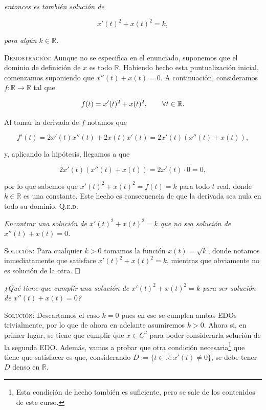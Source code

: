 \documentclass{article}
\begin{document}
\begin{enumerate}
    \textit{entonces es también solución de}

    \[x'(t)^2 + x(t)^2 = k,\]

    \textit{para algún $k \in \mathbb{R}$.}

    \vspace{7px}

    \textsc{Demostración:} Aunque no se especifica en el enunciado, 
    suponemos que el dominio de definición de $x$ es todo $\mathbb{R}$. Habiendo hecho esta puntualización inicial, comenzamos suponiendo que $x''(t) + x(t) = 0$. A continuación, consideramos $f : \mathbb{R} \longrightarrow \mathbb{R}$ tal que 
    
    \[f(t) = x'(t)^2 + x(t)^2, \hspace{20px} \forall t \in \mathbb{R}.\]

    Al tomar la derivada de $f$ notamos que

    \[f'(t) = 2x'(t)x''(t) + 2x(t)x'(t) = 2x'(t)(x''(t) + x(t)),\]

    y, aplicando la hipótesis, llegamos a que

    \[2x'(t)(x''(t) + x(t)) = 2x'(t) \cdot 0 = 0,\]

    por lo que sabemos que $x'(t)^2 + x(t)^2 = f(t) = k$ para todo $t$ real, donde $k \in \mathbb{R}$ es una constante. Este hecho es consecuencia de que la derivada sea nula en todo su dominio. \hfill{\textsc{Q.e.d.}}

    \vspace{7px}

    \textit{Encontrar una solución de $x'(t)^2 + x(t)^2 = k$ que no sea solución de $x''(t) + x(t) = 0$.}

    \vspace{7px}

    \textsc{Solución:} Para cualquier $k > 0$ tomamos la función $x(t) = \sqrt{k}$, donde notamos inmediatamente que satisface $x'(t)^2 + x(t)^2 = k$, mientras que obviamente no es solución de la otra. $\hfill\square$

    \newpage

    \textit{¿Qué tiene que cumplir una solución de $x'(t)^2 + x(t)^2 = k$ para ser solución de $x''(t) + x(t) = 0$?}

    \vspace{7px}

    \textsc{Solución:} Descartamos el caso $k = 0$ pues en ese se cumplen ambas EDOs trivialmente, por lo que de ahora en adelante asumiremos $k > 0$. Ahora si, en primer lugar, se tiene que cumplir que $x \in C^2$ para poder considerarla solución de la segunda EDO. Además, vamos a probar que otra condición necesaria\footnote{Esta condición de hecho también es suficiente, pero se sale de los contenidos de este curso.} que tiene
    que satisfacer es que, considerando $D := \{t \in \mathbb{R}: x'(t) \neq 0\}$, se debe tener $D$ denso en $\mathbb{R}$.


\end{enumerate}
\end{document}
